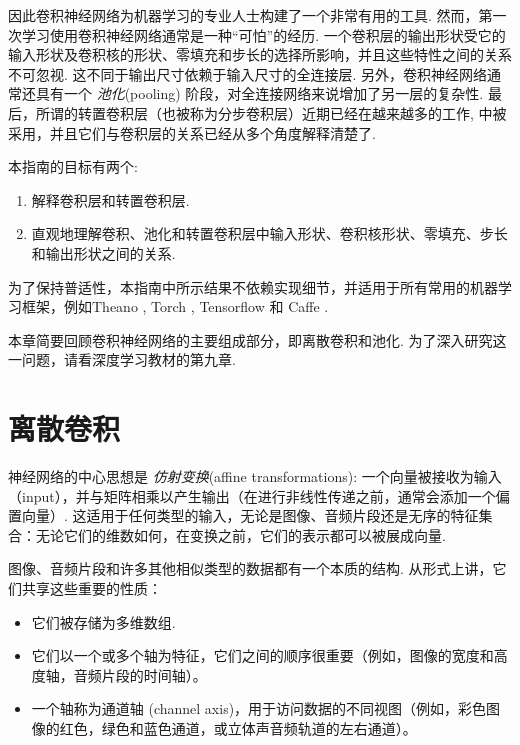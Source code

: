 \documentclass[notitlepage]{ctexrep}
\begin{document}
因此卷积神经网络为机器学习的专业人士构建了一个非常有用的工具. 然而，第一次学习使用卷积神经网络通常是一种``可怕''的经历. 一个卷积层的输出形状受它的输入形状及卷积核的形状、零填充和步长的选择所影响，并且这些特性之间的关系不可忽视. 这不同于输出尺寸依赖于输入尺寸的全连接层. 另外，卷积神经网络通常还具有一个 {\em
池化\/}(pooling) 阶段，对全连接网络来说增加了另一层的复杂性. 最后，所谓的转置卷积层（也被称为分步卷积层）近期已经在越来越多的工作\citep{zeiler2011adaptive,zeiler2014visualizing,
long2015fully,radford2015unsupervised,visin15,im2016generating}, 中被采用，并且它们与卷积层的关系已经从多个角度解释清楚了. 

本指南的目标有两个:

\begin{enumerate}
    \item 解释卷积层和转置卷积层.
    \item 直观地理解卷积、池化和转置卷积层中输入形状、卷积核形状、零填充、步长和输出形状之间的关系. 
\end{enumerate}

为了保持普适性，本指南中所示结果不依赖实现细节，并适用于所有常用的机器学习框架，例如Theano
\citep{bergstra2010theano,bastien2012theano}, Torch \citep{collobert2011torch7},
Tensorflow \citep{abaditensorflow} 和 Caffe \citep{jia2014caffe}.

本章简要回顾卷积神经网络的主要组成部分，即离散卷积和池化. 为了深入研究这一问题，请看深度学习教材的第九章\citep{Goodfellow-et-al-2016-Book}.

\section{离散卷积}

神经网络的中心思想是 \emph{仿射变换}(affine transformations): 一个向量被接收为输入（input），并与矩阵相乘以产生输出（在进行非线性传递之前，通常会添加一个偏置向量）. 这适用于任何类型的输入，无论是图像、音频片段还是无序的特征集合：无论它们的维数如何，在变换之前，它们的表示都可以被展成向量.

图像、音频片段和许多其他相似类型的数据都有一个本质的结构. 从形式上讲，它们共享这些重要的性质：

\begin{itemize}
    \item 它们被存储为多维数组.
    \item 它们以一个或多个轴为特征，它们之间的顺序很重要（例如，图像的宽度和高度轴，音频片段的时间轴）。
    \item 一个轴称为通道轴 (channel axis)，用于访问数据的不同视图（例如，彩色图像的红色，绿色和蓝色通道，或立体声音频轨道的左右通道）。 
\end{itemize}
\end{document}
